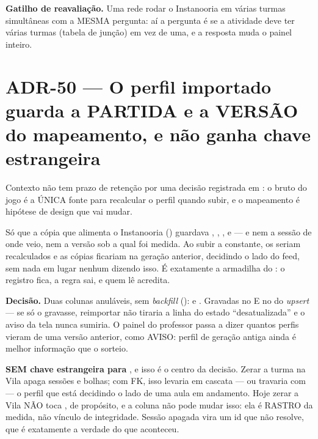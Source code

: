 \textbf{Gatilho de reavaliação.} Uma rede rodar o Instanooria em várias turmas
simultâneas com a MESMA pergunta: aí a pergunta é se a atividade deve ter várias
turmas (tabela de junção) em vez de uma, e a resposta muda o painel inteiro.

\section{ADR-50 --- O perfil importado guarda a PARTIDA e a VERSÃO do
mapeamento, e não ganha chave estrangeira}
\label{adr:perfil-importado-versao}

\begin{especificacao}{Contexto}
 não tem prazo de retenção por uma decisão registrada em
: o bruto do jogo é a ÚNICA fonte para
recalcular o perfil quando  subir, e o mapeamento é
hipótese de design que vai mudar.

Só que a cópia que alimenta o Instanooria
() guardava ,
, ,  e  --- e nem a
sessão de onde veio, nem a versão sob a qual foi medida. Ao subir a constante,
os  seriam recalculados e as cópias ficariam na geração
anterior, decidindo o lado do feed, sem nada em lugar nenhum dizendo isso. É
exatamente a armadilha do : o registro fica, a regra sai, e quem
lê acredita.
\end{especificacao}

\textbf{Decisão.} Duas colunas anuláveis, sem \emph{backfill}
():
 e . Gravadas no  E no
 do \emph{upsert} --- se só o  gravasse, reimportar não
tiraria a linha do estado ``desatualizada'' e o aviso da tela nunca sumiria. O
painel do professor passa a dizer quantos perfis vieram de uma versão anterior,
como AVISO: perfil de geração antiga ainda é melhor informação que o sorteio.

\textbf{SEM chave estrangeira para }, e isso é o centro da
decisão. Zerar a turma na Vila apaga sessões e bolhas; com FK, isso levaria em
cascata --- ou travaria com  --- o perfil que está decidindo o lado
de uma aula em andamento. Hoje zerar a Vila NÃO toca , de
propósito, e a coluna não pode mudar isso: ela é RASTRO da medida, não vínculo
de integridade. Sessão apagada vira um id que não resolve, que é exatamente a
verdade do que aconteceu.


